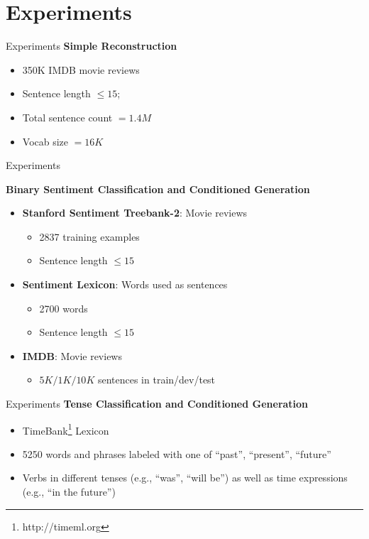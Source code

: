 \documentclass{beamer}
\begin{document}
\section{Experiments}
\begin{frame}{Experiments}
	\textbf{Simple Reconstruction}
	\begin{itemize}
		\item 350K IMDB movie reviews
		\item Sentence length $\leq 15$;
		\item Total sentence count $= 1.4M$
		\item Vocab size $= 16K$
	\end{itemize}
\end{frame}

\begin{frame}{Experiments}

	\textbf{Binary Sentiment Classification and Conditioned Generation}

	\begin{itemize}
		\item \textbf{Stanford Sentiment Treebank-2}: Movie reviews
		      \begin{itemize}
			      \item 2837 training examples
			      \item Sentence length $\leq 15$
		      \end{itemize}
		\item \textbf{Sentiment Lexicon}: Words used as sentences
		      \begin{itemize}
			      \item 2700 words
			      \item Sentence length $\leq 15$
		      \end{itemize}
		\item \textbf{IMDB}: Movie reviews
		      \begin{itemize}
			      \item $5K/1K/10K$ sentences in train/dev/test
		      \end{itemize}
	\end{itemize}
\end{frame}

\begin{frame}{Experiments}
	\textbf{Tense Classification and Conditioned Generation}
	\begin{itemize}
		\item TimeBank\footnote{http://timeml.org} Lexicon
		\item 5250 words and phrases labeled with one of {“past”, “present”, “future”}
		\item Verbs in different tenses (e.g., “was”, “will be”) as well as time expressions (e.g., “in the future”)
	\end{itemize}
\end{frame}
\end{document}
